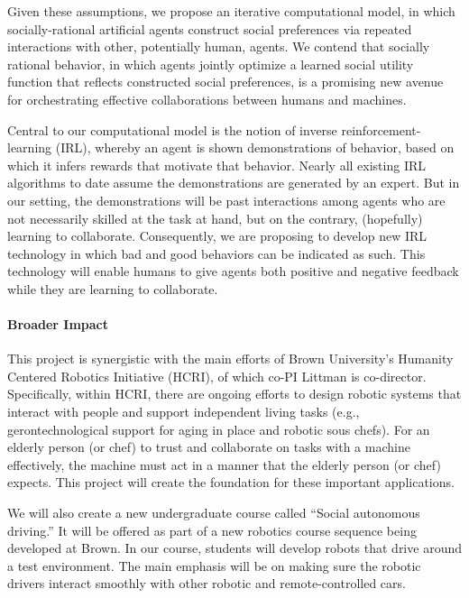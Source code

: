 Given these assumptions, we propose an iterative computational model,
in which socially-rational artificial agents construct social
preferences via repeated interactions with other, potentially human,
agents.  We contend that socially rational behavior, in which agents
jointly optimize a learned social utility function that reflects
constructed social preferences, is a promising new avenue for
orchestrating effective collaborations between humans and machines.

Central to our computational model is the notion of inverse
reinforcement-learning (IRL), whereby an agent is shown demonstrations
of behavior, based on which it infers rewards that motivate that
behavior.  Nearly all existing IRL algorithms to date assume the
demonstrations are generated by an expert.  But in our setting, the
demonstrations will be past interactions among agents who are not
necessarily skilled at the task at hand, but on the contrary,
(hopefully) learning to collaborate.  Consequently, we are proposing
to develop new IRL technology 
in which bad and good behaviors can be indicated as such.  This
technology will enable humans to give agents both positive and
negative feedback while they are learning to collaborate.




\vspace{\up}
\paragraph{Broader Impact}
%
This project is synergistic with the main efforts of Brown
University's Humanity Centered Robotics Initiative (HCRI), of which
co-PI Littman is co-director.  Specifically, within HCRI, there are
ongoing efforts to design robotic systems that interact with people
and support independent living tasks (e.g., gerontechnological support
for aging in place and robotic sous chefs).  For an elderly person (or
chef) to trust and collaborate on tasks with a machine effectively,
the machine must act in a manner that the elderly person (or chef)
expects.  This project will create the foundation for these important
applications.

We will also create a new undergraduate course called ``Social
autonomous driving.''  It will be offered as part of a new robotics
course sequence being developed at Brown.  In our course, students
will develop robots that drive around a test environment.  The main
emphasis will be on making sure the robotic drivers interact smoothly
with other robotic and remote-controlled cars.


